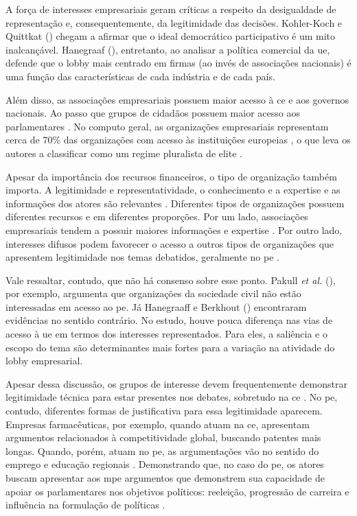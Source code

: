     A força de interesses empresariais geram críticas a respeito da desigualdade de representação e, consequentemente, da legitimidade das decisões. Kohler-Koch e Quittkat (\citeyear{kohler2007desmyth}) chegam a afirmar que o ideal democrático participativo é um mito inalcançável. Hanegraaf (\citeyear{Hanegraaff2024firms}), entretanto, ao analisar a política comercial da \acrshort{ue}, defende que o lobby mais centrado em firmas (ao invés de associações nacionais) é uma função das características de cada indústria e de cada país.

    Além disso, as associações empresariais possuem maior acesso à \acrshort{ce} e aos governos nacionais. Ao passo que grupos de cidadãos possuem maior acesso aos parlamentares \cite{dur20212wholobbies}. No computo geral, as organizações empresariais representam cerca de 70\% das organizações com acesso às instituições europeias \cite{Coen2007}, o que leva os autores a classificar como um regime pluralista de elite \cite{coen1997evolution, coen1998european, Bouwen2002, schmidt2006procedural}.

    Apesar da importância dos recursos financeiros, o tipo de organização também importa. A legitimidade e representatividade, o conhecimento e a expertise e as informações dos atores são relevantes \cite{Coen2019, dur_measuring_2008}. Diferentes tipos de organizações possuem diferentes recursos e em diferentes proporções. Por um lado, associações empresariais tendem a possuir maiores informações e expertise \cite{dur20212wholobbies}. Por outro lado, interesses difusos podem favorecer o acesso a outros tipos de organizações que apresentem legitimidade nos temas debatidos, geralmente no \acrshort{pe} \cite{kluver2015legislative}. 

    Vale ressaltar, contudo, que não há consenso sobre esse ponto. Pakull \textit{et al.} (\citeyear{Pakull2020}), por exemplo, argumenta que organizações da sociedade civil não estão interessadas em acesso ao \acrshort{pe}. Já Hanegraaff e Berkhout (\citeyear{Hanegraaff2019}) encontraram evidências no sentido contrário. No estudo, houve pouca diferença nas vias de acesso à \acrshort{ue} em termos dos interesses representados. Para eles, a saliência e o escopo do tema são determinantes mais fortes para a variação na atividade do lobby empresarial.

    Apesar dessa discussão, os grupos de interesse devem frequentemente demonstrar legitimidade técnica para estar presentes nos debates, sobretudo na \acrshort{ce} \cite{Bouwen2002}. No \acrshort{pe}, contudo, diferentes formas de justificativa para essa legitimidade aparecem. Empresas farmacêuticas, por exemplo, quando atuam na \acrshort{ce}, apresentam argumentos relacionados à competitividade global, buscando patentes mais longas. Quando, porém, atuam no \acrshort{pe}, as argumentações vão no sentido do emprego e educação regionais \cite{earnshaw2002no, coen2000corporate}. Demonstrando que, no caso do \acrshort{pe}, os atores buscam apresentar aos \acrshort{mpe} argumentos que demonstrem sua capacidade de apoiar os parlamentares nos objetivos políticos: reeleição, progressão de carreira e influência na formulação de políticas \cite{Ibenskas2021}.
    
